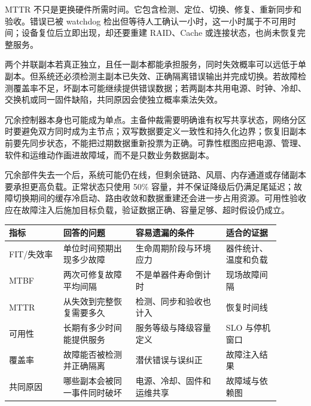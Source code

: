 MTTR 不只是更换硬件所需时间。它包含检测、定位、切换、修复、重新同步和验收。错误已被 watchdog 检出但等待人工确认一小时，这一小时属于不可用时间；设备复位后立即出现，却还要重建 RAID、Cache 或连接状态，也尚未恢复完整服务。


两个并联副本若真正独立，且任一副本都能承担服务，同时失效概率可以远低于单副本。但系统还必须检测主副本已失效、正确隔离错误输出并完成切换。若故障检测覆盖率不足，坏副本可能继续提供错误数据；若两副本共用电源、时钟、冷却、交换机或同一固件缺陷，共同原因会使独立概率乘法失效。

冗余控制器本身也可能成为单点。主备仲裁需要明确谁有权写共享状态，网络分区时要避免双方同时成为主节点；双写数据要定义一致性和持久化边界；恢复旧副本前要先同步状态，不能把过期数据重新投票为正确。可靠性框图应把电源、管理、软件和运维动作画进故障域，而不是只数业务数据副本。


冗余部件失去一个后，系统可能仍在线，但剩余链路、风扇、内存通道或存储副本要承担更高负载。正常状态只使用 50\% 容量，并不保证降级后仍满足尾延迟；故障切换期间的缓存冷启动、路由收敛和数据重建还会进一步占用资源。可用性验收应在故障注入后施加目标负载，验证数据正确、容量足够、超时假设仍成立。

\begin{longtable}{L{0.18\linewidth}L{0.24\linewidth}L{0.30\linewidth}L{0.18\linewidth}}
\toprule
指标 & 回答的问题 & 容易遗漏的条件 & 适合的证据 \\
\midrule
FIT/失效率 & 单位时间预期出现多少故障 & 生命周期阶段与环境应力 & 器件统计、温度和负载 \\\tablerowrule
MTBF & 两次可修复故障平均间隔 & 不是单器件寿命倒计时 & 现场故障间隔 \\\tablerowrule
MTTR & 从失效到完整恢复需要多久 & 检测、同步和验收也计入 & 恢复时间线 \\\tablerowrule
可用性 & 长期有多少时间能提供服务 & 服务等级与降级容量定义 & SLO 与停机窗口 \\\tablerowrule
覆盖率 & 故障能否被检测并正确隔离 & 潜伏错误与误纠正 & 故障注入结果 \\\tablerowrule
共同原因 & 哪些副本会被同一事件同时破坏 & 电源、冷却、固件和运维共享 & 故障域与依赖图 \\
\bottomrule
\end{longtable}
